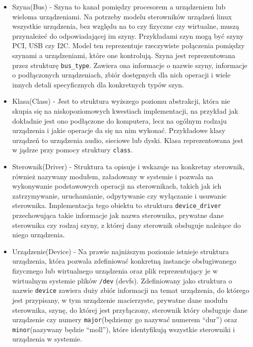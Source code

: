 \documentclass[11pt]{scrartcl}
\begin{document}
\begin{itemize}
\item
  Szyna(Bus) - Szyna to kanał pomiędzy procesorem a urządzeniem lub wieloma urządzeniami. Na potrzeby modelu sterowników urządzeń linux wszystkie urządzenia, bez względu na to czy fizyczne czy wirtualne, muszą przynależeć do odpowiadającej im szyny. Przykładami szyn mogą być szyny PCI, USB czy I2C. Model ten reprezentuje rzeczywiste połączenia pomiędzy szynami a urządzeniami, które one kontrolują. Szyna jest reprezentowana przez strukturę \texttt{bus\_type}. Zawiera ona informacje o nazwie szyny, informacje o podłączonych urządzeniach, zbiór dostępnych dla nich operacji i wiele innych detali specyficznych dla konkretnych typów szyn.
\item
  Klasa(Class) - Jest to struktura wyższego poziomu abstrakcji, która nie skupia się na niskopoziomowych kwestiach implementacji, na przykład jak dokładnie jest ono podłączone do komputera, lecz na ogólnym rodzaju urządzenia i jakie operacje da się na nim wykonać. Przykładowe klasy urządzeń to urządzenia audio, sieciowe lub dyski. Klasa reprezentowana jest w jądrze przy pomocy struktury \texttt{class}.
\item
  Sterownik(Driver) - Struktura ta opisuje i wskazuje na konkretny sterownik, również nazywany modułem, załadowany w systemie i pozwala na wykonywanie podstawowych operacji na sterownikach, takich jak ich zatrzymywanie, uruchamianie, odpytywanie czy wyłączanie i usuwanie sterownika. Implementacja tego obiektu to struktura \texttt{device\_driver} przechowująca takie informacje jak nazwa sterownika, prywatne dane sterownika czy rodzaj szyny, z której dany sterownik obsługuje należące do niego urządzenia.
\item
  Urządzenie(Device) - Na prawie najniższym poziomie istnieje struktura urządzenia, która pozwala zdefiniować konkretną instancje obsługiwanego fizycznego lub wirtualnego urządzenia oraz plik reprezentujący je w wirtualnym systemie plików \texttt{/dev} (devfs).  Zdefiniowany jako struktura o nazwie \texttt{device} zawiera duży zbiór informacji na temat urządzenia, do którego jest przypisany, w tym urządzenie macierzyste, prywatne dane modułu sterownika, szynę, do której jest przyłączony, sterownik który obsługuje dane urządzenie czy numery \texttt{major}(będziemy go nazywać numerem ``dur'') oraz \texttt{minor}(nazywany będzie ``moll''), które identyfikują wszystkie sterowniki i urządzenia w systemie.
\end{itemize}
\end{document}

